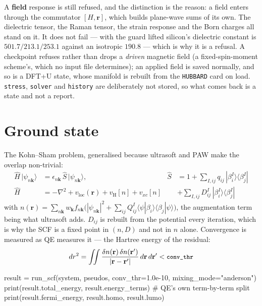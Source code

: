 \documentclass[11pt,a4paper]{article}
\newcommand{\code}[1]{\texttt{\small #1}}
\begin{document}
\begin{refuses}
A \textbf{field} response is still refused, and the distinction is the reason: a
field enters through the commutator $[H,\mathbf r]$, which builds plane-wave
sums of its own. The dielectric tensor, the Raman tensor, the strain response
and the Born charges all stand on it. It does not fail --- with the guard
lifted silicon's dielectric constant is $501.7/213.1/253.1$ against an isotropic
$190.8$ --- which is why it is a refusal. A checkpoint refuses rather than drops a
\emph{driven} magnetic field (a fixed-spin-moment scheme's, which no input file
determines); an applied field is saved normally, and so is a DFT+U state, whose
manifold is rebuilt from the \code{HUBBARD} card on load. \code{stress}, \code{solver} and
\code{history} are deliberately not stored, so what comes back is a state and
not a report.
\end{refuses}

\section{Ground state}

The Kohn--Sham problem, generalised because ultrasoft and PAW make the overlap
non-trivial:
\begin{align*}
\hat H\,|\psi_{n\mathbf k}\rangle &= \epsilon_{n\mathbf k}\,\hat S\,|\psi_{n\mathbf k}\rangle,
& \hat S &= 1 + \sum_{I,ij} q_{ij}\,|\beta_i^I\rangle\langle\beta_j^I| \\[2pt]
\hat H &= -\nabla^2 + v_{\mathrm{loc}}(\mathbf r) + v_{\mathrm H}[n] + v_{xc}[n]
  &&+ \sum_{I,ij} D_{ij}^I\,|\beta_i^I\rangle\langle\beta_j^I|
\end{align*}
with
$n(\mathbf r) = \sum_{n\mathbf k} w_{\mathbf k} f_{n\mathbf k}
\big(|\psi_{n\mathbf k}|^2 + \sum_{ij} Q_{ij}^I \langle\psi|\beta_i\rangle\langle\beta_j|\psi\rangle\big)$,
the augmentation term being what ultrasoft adds. $D_{ij}$ is rebuilt from the
potential every iteration, which is why the SCF is a fixed point in $(n,D)$ and
not in $n$ alone. Convergence is measured as QE measures it --- the Hartree
energy of the residual:
\begin{equation*}
dr^2 = \iint \frac{\delta n(\mathbf r)\,\delta n(\mathbf r')}{|\mathbf r-\mathbf r'|}
  \,d\mathbf r\,d\mathbf r' < \code{conv\_thr}
\end{equation*}

\begin{pycode}
result = run_scf(system, pseudos, conv_thr=1.0e-10, mixing_mode="anderson")
print(result.total_energy, result.energy_terms)   # QE's own term-by-term split
print(result.fermi_energy, result.homo, result.lumo)
\end{pycode}
\end{document}
